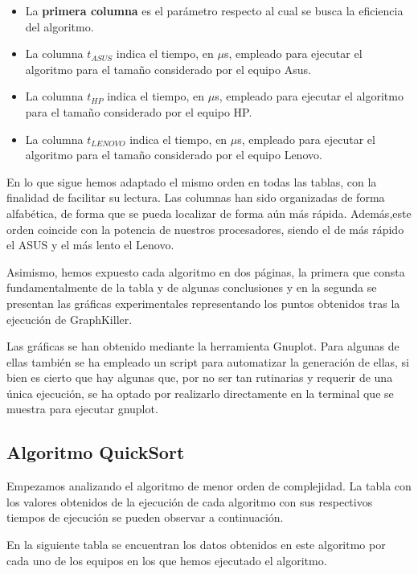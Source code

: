 \documentclass{homework}
\begin{document}
    \begin{itemize}
        \item La \textbf{primera columna} es el parámetro respecto al cual se busca la eficiencia del algoritmo.
        \item La columna $t_{ASUS}$ indica el tiempo, en $\mu$s, empleado para ejecutar el algoritmo para el tamaño considerado por el equipo Asus.
        \item La columna $t_{HP}$ indica el tiempo, en $\mu$s, empleado para ejecutar el algoritmo para el tamaño considerado por el equipo HP.
        \item La columna $t_{LENOVO}$ indica el tiempo, en $\mu$s, empleado para ejecutar el algoritmo para el tamaño considerado por el equipo Lenovo.
    \end{itemize}
    
    En lo que sigue hemos adaptado el mismo orden en todas las tablas, con la finalidad de facilitar su lectura. Las columnas
    han sido organizadas de forma alfabética, de forma que se pueda localizar de forma aún más rápida. Además,este orden coincide con la potencia de nuestros procesadores,
    siendo el de más rápido el ASUS y el más lento el Lenovo.

    Asimismo, hemos expuesto cada algoritmo en dos páginas, la primera que consta fundamentalmente de la tabla y
    de algunas conclusiones y en la segunda se presentan las gráficas experimentales representando los puntos
    obtenidos tras la ejecución de GraphKiller. 

    Las gráficas se han obtenido mediante la herramienta Gnuplot. Para algunas de ellas también se ha empleado un script
    para automatizar la generación de ellas, si bien es cierto que hay algunas que, por no ser tan rutinarias y requerir
    de una única ejecución, se ha optado por realizarlo directamente en la terminal que se muestra para ejecutar gnuplot.

    \newpage

    \subsection{Algoritmo QuickSort}

    Empezamos analizando el algoritmo de menor orden de complejidad. La tabla con los valores obtenidos de la ejecución
    de cada algoritmo con sus respectivos tiempos de ejecución se pueden observar a continuación.

    En la siguiente tabla se encuentran los datos obtenidos en este algoritmo por cada uno de los
    equipos en los que hemos ejecutado el algoritmo. 
\end{document}
